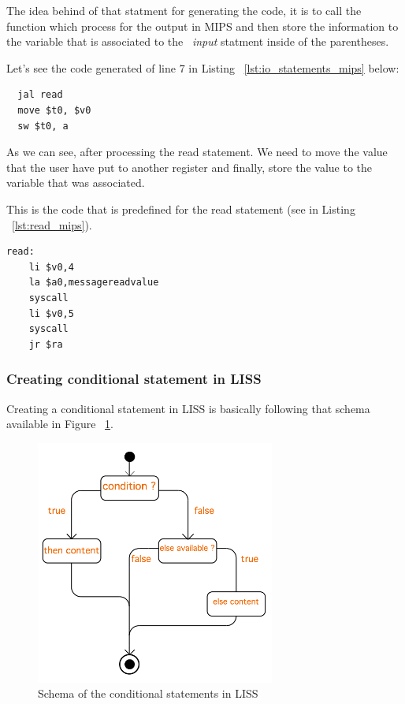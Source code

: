 \documentclass[
  oneside,
  11pt, a4paper,
  footinclude=true,
  headinclude=true,
  cleardoublepage=empty
]{scrbook}
\begin{document}
The idea behind of that statment for generating the code, it is to call the function which process for the output in MIPS and then store the information to the variable that is associated to the ~\textit{input} statment inside of the parentheses.

Let's see the code generated of line 7 in Listing ~\ref{lst:io_statements_mips} below:

\begin{lstlisting}
  jal read		
  move $t0, $v0		
  sw $t0, a		
\end{lstlisting}

As we can see, after processing the read statement. We need to move the value that the user have put to another register and finally, store the value to the variable that was associated.

This is the code that is predefined for the read statement (see in Listing ~\ref{lst:read_mips}).

\begin{lstlisting}[caption={Read statement code in MIPS},label={lst:read_mips}]
  read: 
    li $v0,4
    la $a0,messagereadvalue
    syscall
    li $v0,5
    syscall
    jr $ra
\end{lstlisting}

\subsubsection{Creating conditional statement in LISS}

Creating a conditional statement in LISS is basically following that schema available in Figure ~\ref{fig:conditional_figure}.

\begin{figure}[h!]
  \centering
    \includegraphics[width=0.7\textwidth]{img/conditional_statement.png}
    \caption{Schema of the conditional statements in LISS}
    \label{fig:conditional_figure}
\end{figure}
\end{document}
